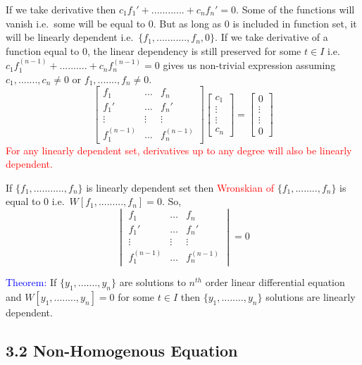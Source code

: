\documentclass[
  11pt,
]{article}
\begin{document}
If we take derivative then \(c_1f_1'+............+c_nf_n'=0\). Some of
the functions will vanish i.e.~some will be equal to 0. But as long as 0
is included in function set, it will be linearly dependent
i.e.~\(\{f_1,...........,f_n, 0\}\). If we take derivative of a function
equal to 0, the linear dependency is still preserved for some
\(t \in I\) i.e.~\(c_1f_1^{(n-1)}+..........+c_nf_n^{(n-1)}=0\) gives us
non-trivial expression assuming \(c_1,.......,c_n \neq 0\) or
\(f_1,.......,f_n \neq 0\). \[
\begin{bmatrix}
    f_{1} &\dots & f_{n} \\
    f_{1}' & \dots & f_{n}' \\
    \vdots & \vdots & \vdots \\
    f_{1}^{(n-1)} & \dots & f_{n}^{(n-1)}
\end{bmatrix}
\begin{bmatrix}
    c_{1} \\
    \vdots \\
    \vdots \\
    c_{n}
\end{bmatrix}
=
\begin{bmatrix}
    0 \\
    \vdots \\
    \vdots \\
   0
\end{bmatrix}
\]
\textcolor{red}{For any linearly dependent set, derivatives up to any degree will also be linearly dependent.}

If \(\{f_1,...........,f_n\}\) is linearly dependent set then
\textcolor{red}{Wronskian of} \(\{f_1,........,f_n\}\) is equal to 0
i.e.~\(W[f_1,.........,f_n]=0\). So, \[
\begin{vmatrix}
    f_{1} &\dots & f_{n} \\
    f_{1}' & \dots & f_{n}' \\
    \vdots & \vdots & \vdots \\
    f_{1}^{(n-1)} & \dots & f_{n}^{(n-1)}
\end{vmatrix}
=
0
\]

\textcolor{blue}{Theorem:} If \(\{y_1,.......,y_n\}\) are solutions to
\(n^{th}\) order linear differential equation and
\(W[y_1,........,y_n]=0\) for some \(t \in I\) then
\(\{y_1,........,y_n\}\) solutions are linearly dependent.

\newpage

\subsection{3.2 Non-Homogenous Equation}\label{non-homogenous-equation}
\end{document}

